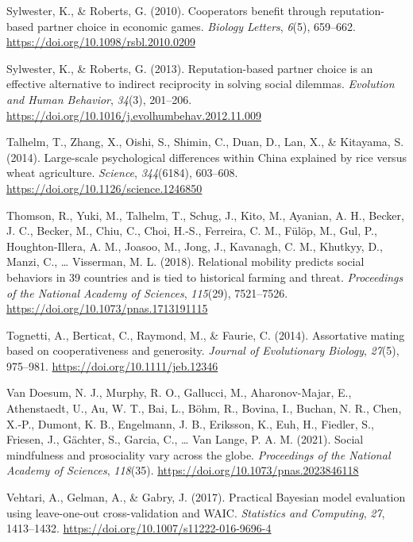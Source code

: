 \documentclass[
  man,floatsintext]{apa6}
\newlength{\cslhangindent}
\newlength{\cslentryspacingunit} %
\newenvironment{CSLReferences}[2] %
 {%
  \setlength{\parindent}{0pt}
  \ifodd #1
  \let\oldpar\par
  \def\par{\hangindent=\cslhangindent\oldpar}
  \fi
  \setlength{\parskip}{#2\cslentryspacingunit}
 }%
 {}
\begin{document}
\begin{CSLReferences}{1}{0}
\leavevmode{}%
Sylwester, K., \& Roberts, G. (2010). Cooperators benefit through reputation-based partner choice in economic games. \emph{Biology Letters}, \emph{6}(5), 659--662. \url{https://doi.org/10.1098/rsbl.2010.0209}

\leavevmode{}%
Sylwester, K., \& Roberts, G. (2013). Reputation-based partner choice is an effective alternative to indirect reciprocity in solving social dilemmas. \emph{Evolution and Human Behavior}, \emph{34}(3), 201--206. \url{https://doi.org/10.1016/j.evolhumbehav.2012.11.009}

\leavevmode{}%
Talhelm, T., Zhang, X., Oishi, S., Shimin, C., Duan, D., Lan, X., \& Kitayama, S. (2014). Large-scale psychological differences within {C}hina explained by rice versus wheat agriculture. \emph{Science}, \emph{344}(6184), 603--608. \url{https://doi.org/10.1126/science.1246850}

\leavevmode{}%
Thomson, R., Yuki, M., Talhelm, T., Schug, J., Kito, M., Ayanian, A. H., Becker, J. C., Becker, M., Chiu, C., Choi, H.-S., Ferreira, C. M., Fülöp, M., Gul, P., Houghton-Illera, A. M., Joasoo, M., Jong, J., Kavanagh, C. M., Khutkyy, D., Manzi, C., \ldots{} Visserman, M. L. (2018). Relational mobility predicts social behaviors in 39 countries and is tied to historical farming and threat. \emph{Proceedings of the National Academy of Sciences}, \emph{115}(29), 7521--7526. \url{https://doi.org/10.1073/pnas.1713191115}

\leavevmode{}%
Tognetti, A., Berticat, C., Raymond, M., \& Faurie, C. (2014). Assortative mating based on cooperativeness and generosity. \emph{Journal of Evolutionary Biology}, \emph{27}(5), 975--981. \url{https://doi.org/10.1111/jeb.12346}

\leavevmode{}%
Van Doesum, N. J., Murphy, R. O., Gallucci, M., Aharonov-Majar, E., Athenstaedt, U., Au, W. T., Bai, L., Böhm, R., Bovina, I., Buchan, N. R., Chen, X.-P., Dumont, K. B., Engelmann, J. B., Eriksson, K., Euh, H., Fiedler, S., Friesen, J., Gächter, S., Garcia, C., \ldots{} Van Lange, P. A. M. (2021). Social mindfulness and prosociality vary across the globe. \emph{Proceedings of the National Academy of Sciences}, \emph{118}(35). \url{https://doi.org/10.1073/pnas.2023846118}

\leavevmode{}%
Vehtari, A., Gelman, A., \& Gabry, J. (2017). Practical {B}ayesian model evaluation using leave-one-out cross-validation and {WAIC}. \emph{Statistics and Computing}, \emph{27}, 1413--1432. \url{https://doi.org/10.1007/s11222-016-9696-4}


\end{CSLReferences}
\end{document}
